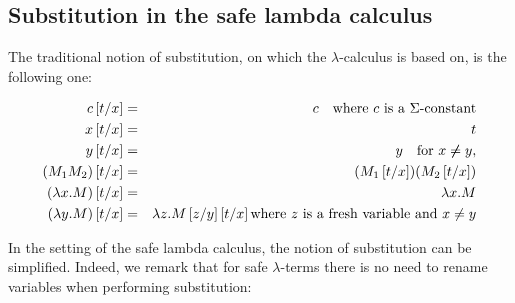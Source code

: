 \subsection{Substitution in the safe lambda calculus}

The traditional notion of substitution, on which the
$\lambda$-calculus is based on, is the following one:
\begin{dfn}[Substitution]
\label{dfn:subst}
\begin{eqnarray*}
c \left[ t/x \right] &=& c \quad \mbox{where $c$ is a $\Sigma$-constant}\\
x \left[ t/x \right] &=& t\\
 y\left[ t/x \right] &=& y \quad \mbox{for } x \not \neq y,\\
(M_1 M_2) \left[ t/x \right] &=& (M_1 \left[ t/x \right]) (M_2 \left[ t/x \right])\\
(\lambda x . M) \left[ t/x \right] &=& \lambda x . M\\
(\lambda y . M) \left[ t/x \right] &=& \lambda z . M \left[ z/y \right]
\left[ t/x \right] \mbox{where $z$ is a fresh variable and $x\not = y$}
\end{eqnarray*}
\end{dfn}

In the setting of the safe lambda calculus, the notion of
substitution can be simplified. Indeed, we remark that for safe
$\lambda$-terms there is no need to rename variables when performing
substitution:

